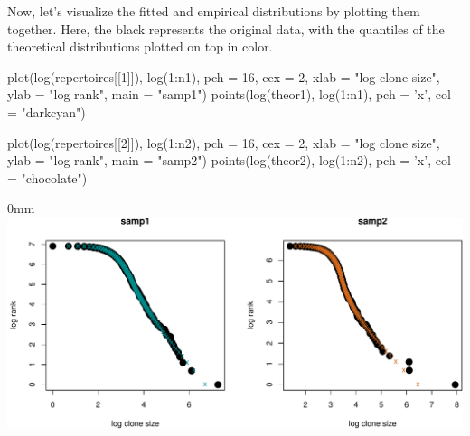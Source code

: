 \documentclass[]{article}
\newcommand{\hlnum}[1]{\textcolor[rgb]{0.816,0.125,0.439}{#1}}%
\newcommand{\hlstr}[1]{\textcolor[rgb]{0.251,0.627,0.251}{#1}}%
\newcommand{\hlstd}[1]{\textcolor[rgb]{0.251,0.251,0.251}{#1}}%
\newcommand{\hlkwc}[1]{\textcolor[rgb]{0.251,0.251,0.251}{#1}}%
\newcommand{\hlkwd}[1]{\textcolor[rgb]{0.878,0.439,0.125}{#1}}%
\newenvironment{Shaded}{\begin{myshaded}}{\end{myshaded}}
\newcommand{\KeywordTok}[1]{\hlkwd{#1}}
\newcommand{\DataTypeTok}[1]{\hlkwc{#1}}
\newcommand{\DecValTok}[1]{\hlnum{#1}}
\newcommand{\StringTok}[1]{\hlstr{#1}}
\newcommand{\NormalTok}[1]{\hlstd{#1}}
\theoremstyle{definition}
\theoremstyle{definition}
\theoremstyle{definition}
\theoremstyle{remark}
\begin{document}
Now, let's visualize the fitted and empirical distributions by plotting
them together. Here, the black represents the original data, with the
quantiles of the theoretical distributions plotted on top in color.

\begin{Shaded}
\begin{Highlighting}[]
\KeywordTok{plot}\NormalTok{(}\KeywordTok{log}\NormalTok{(repertoires[[}\DecValTok{1}\NormalTok{]]), }\KeywordTok{log}\NormalTok{(}\DecValTok{1}\NormalTok{:n1), }\DataTypeTok{pch =} \DecValTok{16}\NormalTok{, }\DataTypeTok{cex =} \DecValTok{2}\NormalTok{,}
     \DataTypeTok{xlab =} \StringTok{"log clone size"}\NormalTok{, }\DataTypeTok{ylab =} \StringTok{"log rank"}\NormalTok{, }\DataTypeTok{main =} \StringTok{"samp1"}\NormalTok{)}
\KeywordTok{points}\NormalTok{(}\KeywordTok{log}\NormalTok{(theor1), }\KeywordTok{log}\NormalTok{(}\DecValTok{1}\NormalTok{:n1), }\DataTypeTok{pch =} \StringTok{'x'}\NormalTok{, }\DataTypeTok{col =} \StringTok{"darkcyan"}\NormalTok{)}

\KeywordTok{plot}\NormalTok{(}\KeywordTok{log}\NormalTok{(repertoires[[}\DecValTok{2}\NormalTok{]]), }\KeywordTok{log}\NormalTok{(}\DecValTok{1}\NormalTok{:n2), }\DataTypeTok{pch =} \DecValTok{16}\NormalTok{, }\DataTypeTok{cex =} \DecValTok{2}\NormalTok{,}
     \DataTypeTok{xlab =} \StringTok{"log clone size"}\NormalTok{, }\DataTypeTok{ylab =} \StringTok{"log rank"}\NormalTok{, }\DataTypeTok{main =} \StringTok{"samp2"}\NormalTok{)}
\KeywordTok{points}\NormalTok{(}\KeywordTok{log}\NormalTok{(theor2), }\KeywordTok{log}\NormalTok{(}\DecValTok{1}\NormalTok{:n2), }\DataTypeTok{pch =} \StringTok{'x'}\NormalTok{, }\DataTypeTok{col =} \StringTok{"chocolate"}\NormalTok{)}
\end{Highlighting}
\end{Shaded}

\begin{adjustwidth}{\fltoffset}{0mm}
\includegraphics{powerTCR_files/figure-latex/unnamed-chunk-7-1} \end{adjustwidth}
\end{document}
